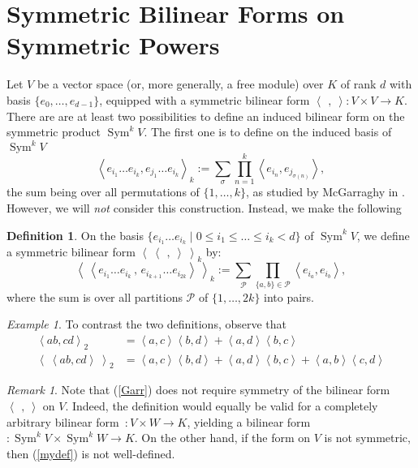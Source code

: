 \documentclass{amsart}
\DeclareMathOperator{\Sym}{Sym}
\newcommand{\coloneqq}{:=}
\newcommand{\bra}{\left<\!\!\!\:\left<}
\newcommand{\ket}{\right>\!\!\!\:\right>}
\theoremstyle{plain}
\theoremstyle{definition}
\newtheorem{definition}[theorem]{Definition}
\theoremstyle{remark}
\newtheorem{remark}[theorem]{Remark}
\newtheorem{example}[theorem]{Example}
\begin{document}
\section{Symmetric Bilinear Forms on Symmetric Powers}
Let $V$ be a vector space (or, more generally, a free module) over $K$ of rank $d$ with basis $\{e_0,\ldots,e_{d-1}\}$, equipped with a symmetric bilinear form $\left<\,\ ,\ \right>: V\times V \rightarrow K$. There are
are at least two possibilities to define an induced bilinear form on the symmetric product $\Sym^kV$. The first one is to define on the induced basis of $\Sym^kV$
\begin{equation}\label{Garr}
\left< e_{i_1}\ldots e_{i_k}, e_{j_1}\ldots e_{i_k}\right>_k \coloneqq \sum_\sigma  
\prod_{n=1}^k \left< e_{i_n},e_{j_{\sigma(n)}}\right>,
\end{equation}
the sum being over all permutations of $\{1,\ldots,k\}$, as studied by McGarraghy in \cite{McGarr}. However, we will \emph{not} consider 
this construction. Instead, we make the following
\begin{definition} On the basis $\{e_{i_1}\ldots e_{i_k}\;|\;0\leq i_1\leq\ldots\leq i_k<d\}$ of $\Sym^kV$, we define a symmetric bilinear form $\bra\ \,,\ \ket_k$ by: 
\begin{equation}
\label{mydef}
\bra e_{i_1}\ldots e_{i_k}\,,\,e_{i_{k+1}}\ldots e_{i_{2k}} \ket_k \coloneqq \sum_{\mathcal{P}} \prod_{\{a,b\}\in\mathcal{P}} \left<e_{i_a},e_{i_b}\right>,
\end{equation}
where the sum is over all partitions $\mathcal{P}$ of $\{1,\ldots,2k\}$ into pairs.
\end{definition}
\begin{example}
To contrast the two definitions, observe that 
\begin{align}
\left<ab,cd\right>_2 &= \left<a,c\right>\left<b,d\right>+\left<a,d\right>\left<b,c\right> \\
\bra ab,cd\ket_2 &= \left<a,c\right>\left<b,d\right>+\left<a,d\right>\left<b,c\right> + \left<a,b\right>\left<c,d\right> 
\end{align}
\end{example}
\begin{remark}
Note that (\ref{Garr}) does not require symmetry of the bilinear form $\left<\,\ ,\ \right>$ on $V$. Indeed, the definition would equally be valid for a completely arbitrary bilinear form~$: V\times W \rightarrow K$, yielding a bilinear form $:\Sym^kV\times\Sym^kW\rightarrow K$. On the other hand, if the form on $V$ is not symmetric, then (\ref{mydef}) is not well-defined.
\end{remark}
\end{document}
